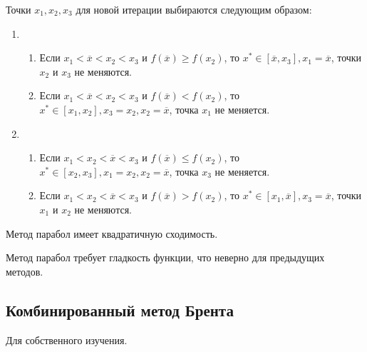 Точки \(x_1, x_2, x_3\) для новой итерации выбираются следующим образом:
\begin{enumerate}
    \item \begin{enumerate}
              \item Если \(x_1 < \overline x < x_2 < x_3\) и \(f(\overline x) \geq f(x_2)\), то \(x^* \in [\overline x, x_3], x_1 = \overline x\), точки \(x_2\) и \(x_3\) не меняются.
              \item Если \(x_1 < \overline x < x_2 < x_3\) и \(f(\overline x) < f(x_2)\), то \(x^* \in [x_1, x_2], x_3 = x_2, x_2 = \overline x\), точка \(x_1\) не меняется.
          \end{enumerate}
    \item \begin{enumerate}
              \item Если \(x_1 < x_2 < \overline x < x_3\) и \(f(\overline x) \leq f(x_2)\), то \(x^* \in [x_2, x_3], x_1 = x_2, x_2 = \overline x\), точка \(x_3\) не меняется.
              \item Если \(x_1 < x_2 < \overline x < x_3\) и \(f(\overline x) > f(x_2)\), то \(x^* \in [x_1, \overline x], x_3 = \overline x\), точки \(x_1\) и \(x_2\) не меняются.
          \end{enumerate}
\end{enumerate}

\begin{remark}
    Метод парабол имеет квадратичную сходимость.
\end{remark}

\begin{remark}
    Метод парабол требует гладкость функции, что неверно для предыдущих методов.
\end{remark}

\subsection{Комбинированный метод Брента}

Для собственного изучения.
